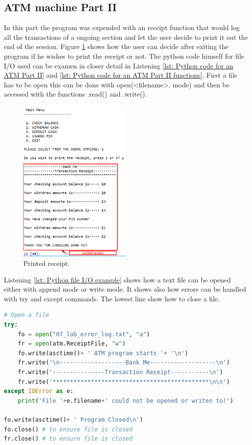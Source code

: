 \subsection{ATM machine Part II}\label{subsec: ATM machine Part II}
In this part the program was expended with an receipt function that would log all the transactions of a ongoing section and let the user decide to print it out the end of the session. Figure \ref{fig: Printed receipt} shows how the user can decide after exiting the program if he wishes to print the receipt or not. The python code himself for file I/O used can be examen in closer detail in Listening \ref{lst: Python code for an ATM Part II} and \ref{lst: Python code for an ATM Part II functions}. First a file has to be open this can be done with open(<filename>, mode) and then be accessed with the functions .read() and .write(). 

\begin{figure}[H]
	\centering
	\includegraphics[width=0.5\textwidth]{01_images/printed_receipt.PNG}
	\caption{Printed receipt.}
	\label{fig: Printed receipt}
\end{figure}
Listening \ref{lst: Python file I/O example} shows how a text file can be opened either with append mode or write mode. It shows also how errors can be handled with try and except commands. The lowest line show how to close a file.
\begin{lstlisting}[style=PythonStyle, language=Python, caption={Python file I/O example.},label=lst: Python file I/O example ]
# Open a file
try:
	fo = open("07_lab_error_log.txt", "a")
	fr = open(atm.ReceiptFile, "w")
	fo.write(asctime()+ ' ATM program starts '+ '\n')
	fr.write('\n-------------------Bank Me-------------------\n')
	fr.write('---------------Transaction Receipt-----------\n')
	fr.write('*********************************************\n\n')
except IOError as e:
	print('File '+e.filename+' could not be opened or writen to!') 

fo.write(asctime()+ ' Program Closed\n')
fo.close() # to ensure file is closed
fr.close() # to ensure file is closed
\end{lstlisting}

